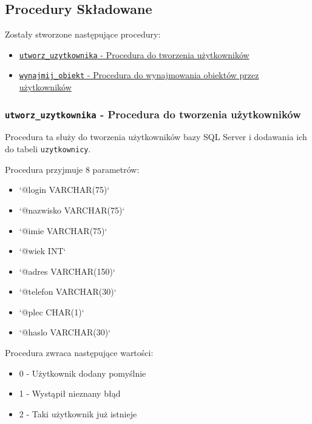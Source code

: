 \subsection{Procedury Składowane}

Zostały stworzone następujące procedury:
\begin{itemize}
	\item \href{run:Sources/SQL/6. Procedury Składowamne/032_Utworzenie_procedury_skladowanej_do_tworzenia_uzytkownikow.sql}{\texttt{utworz\_uzytkownika} - Procedura do tworzenia użytkowników}
	\item \href{run:Sources/SQL/6. Procedury Składowamne/031_Utworzenie_procedury_skladowanej_wynajmowania_obiektow.sql}{\texttt{wynajmij\_obiekt} - Procedura do wynajmowania obiektów przez użytkowników}
\end{itemize}

\subsubsection{\texttt{utworz\_uzytkownika} - Procedura do tworzenia użytkowników}

Procedura ta służy do tworzenia użytkowników bazy SQL Server i dodawania ich do tabeli \texttt{uzytkownicy}.

Procedura przyjmuje 8 parametrów:
\begin{itemize}
	\item `@login VARCHAR(75)`
	\item `@nazwisko VARCHAR(75)`
	\item `@imie VARCHAR(75)`
	\item `@wiek INT`
	\item `@adres VARCHAR(150)`
	\item `@telefon VARCHAR(30)`
	\item `@plec CHAR(1)`
	\item `@haslo VARCHAR(30)`
\end{itemize}

Procedura zwraca następujące wartości:
\begin{itemize}
	\item 0 - Użytkownik dodany pomyślnie
	\item 1 - Wystąpił nieznany błąd
	\item 2 - Taki użytkownik już istnieje
\end{itemize}

